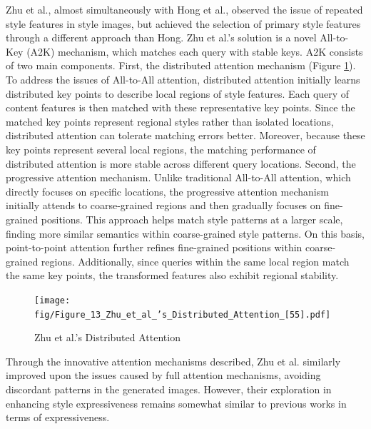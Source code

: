 Zhu et al.\citep{55zhu2023all}, almost simultaneously with Hong et al.\citep{54hong2023aespa}, observed the issue of repeated style features in style images, but achieved the selection of primary style features through a different approach than Hong\citep{54hong2023aespa}. Zhu et al.'s solution is a novel All-to-Key (A2K) mechanism, which matches each query with stable keys. A2K consists of two main components. First, the distributed attention mechanism (Figure \ref{fig9_Zhu}). To address the issues of All-to-All attention, distributed attention initially learns distributed key points to describe local regions of style features. Each query of content features is then matched with these representative key points. Since the matched key points represent regional styles rather than isolated locations, distributed attention can tolerate matching errors better. Moreover, because these key points represent several local regions, the matching performance of distributed attention is more stable across different query locations. Second, the progressive attention mechanism. Unlike traditional All-to-All attention, which directly focuses on specific locations, the progressive attention mechanism initially attends to coarse-grained regions and then gradually focuses on fine-grained positions. This approach helps match style patterns at a larger scale, finding more similar semantics within coarse-grained style patterns. On this basis, point-to-point attention further refines fine-grained positions within coarse-grained regions. Additionally, since queries within the same local region match the same key points, the transformed features also exhibit regional stability.

\begin{figure}[!htbp]%
    \centering%
    \texttt{[image: fig/Figure\_13\_Zhu\_et\_al\_’s\_Distributed\_Attention\_[55].pdf]}
    \caption{Zhu et al.'s Distributed Attention\citep{55zhu2023all}}\label{fig9_Zhu}
\end{figure}

Through the innovative attention mechanisms described, Zhu et al. similarly improved upon the issues caused by full attention mechanisms, avoiding discordant patterns in the generated images. However, their exploration in enhancing style expressiveness\citep{55zhu2023all} remains somewhat similar to previous works in terms of expressiveness.

